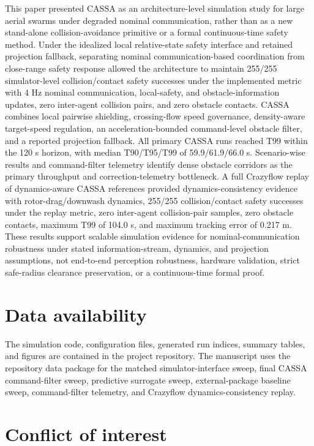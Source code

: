 \documentclass[11pt]{article}
\begin{document}
This paper presented CASSA as an architecture-level simulation study for large aerial swarms under degraded nominal communication, rather than as a new stand-alone collision-avoidance primitive or a formal continuous-time safety method. Under the idealized local relative-state safety interface and retained projection fallback, separating nominal communication-based coordination from close-range safety response allowed the architecture to maintain 255/255 simulator-level collision/contact safety successes under the implemented metric with 4 Hz nominal communication, local-safety, and obstacle-information updates, zero inter-agent collision pairs, and zero obstacle contacts. CASSA combines local pairwise shielding, crossing-flow speed governance, density-aware target-speed regulation, an acceleration-bounded command-level obstacle filter, and a reported projection fallback. All primary CASSA runs reached T99 within the 120 s horizon, with median T90/T95/T99 of 59.9/61.9/66.0 s. Scenario-wise results and command-filter telemetry identify dense obstacle corridors as the primary throughput and correction-telemetry bottleneck. A full Crazyflow replay of dynamics-aware CASSA references provided dynamics-consistency evidence with rotor-drag/downwash dynamics, 255/255 collision/contact safety successes under the replay metric, zero inter-agent collision-pair samples, zero obstacle contacts, maximum T99 of 104.0 s, and maximum tracking error of 0.217 m. These results support scalable simulation evidence for nominal-communication robustness under stated information-stream, dynamics, and projection assumptions, not end-to-end perception robustness, hardware validation, strict safe-radius clearance preservation, or a continuous-time formal proof.

\section*{Data availability}

The simulation code, configuration files, generated run indices, summary tables, and figures are contained in the project repository. The manuscript uses the repository data package for the matched simulator-interface sweep, final CASSA command-filter sweep, predictive surrogate sweep, external-package baseline sweep, command-filter telemetry, and Crazyflow dynamics-consistency replay.

\section*{Conflict of interest}
\end{document}
